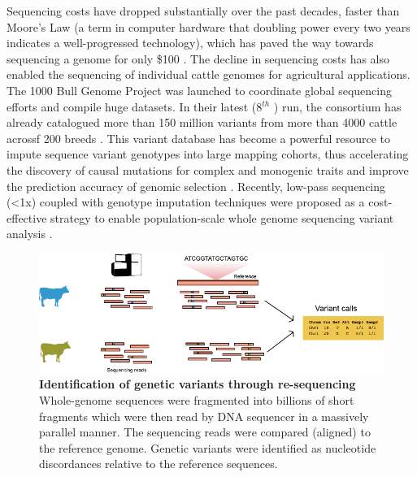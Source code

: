 \documentclass[../main.tex]{subfiles}
\begin{document}
Sequencing costs have dropped substantially over the past decades, faster than Moore’s Law (a term in computer hardware that doubling power every two years indicates a well-progressed technology), which has paved the way towards sequencing a genome for only \$100 \citep{Regalado2020,Wetterstrand2020}. The decline in sequencing costs has also enabled the sequencing of individual cattle genomes for agricultural applications. The 1000 Bull Genome Project was launched to coordinate global sequencing efforts and compile huge datasets.  In their latest  (8$^{th}$ ) run, the consortium has already catalogued more than 150 million variants from more than 4000 cattle acrossf 200 breeds \citep{hayes20191000}. This variant database has become a powerful resource to impute sequence variant genotypes into large mapping cohorts, thus accelerating the discovery of causal mutations  for complex and monogenic traits and improve the prediction accuracy of genomic selection \citep{daetwyler2014whole}. Recently, low-pass sequencing (<1x) coupled with genotype imputation techniques were proposed as a cost-effective strategy to enable population-scale whole genome sequencing variant analysis \citep{snelling2020assessment}. \\

\bigskip

\begin{figure}[!htb]
    \centering
    \includegraphics[width=\textwidth]{intro/fig1.pdf}
        \vspace{3mm}
        \caption[Identification of genetic variants through re-sequencing]{\textbf{Identification of genetic variants through re-sequencing} \\
        \footnotesize{Whole-genome sequences were fragmented into billions of short fragments which were then read by DNA sequencer in a massively parallel manner. The sequencing reads were compared (aligned) to the reference genome. Genetic variants were identified as nucleotide discordances relative to the reference sequences.}}
        \label{fig11:reseq}
\end{figure}
\end{document}
